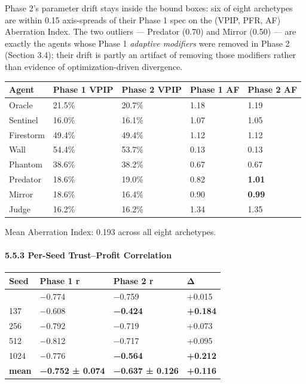 \documentclass[
]{article}
\begin{document}
Phase 2's parameter drift stays inside the bound boxes: six of eight
archetypes are within 0.15 axis-spreads of their Phase 1 spec on the
(VPIP, PFR, AF) Aberration Index. The two outliers --- Predator (0.70)
and Mirror (0.50) --- are exactly the agents whose Phase 1
\emph{adaptive modifiers} were removed in Phase 2 (Section 3.4); their
drift is partly an artifact of removing those modifiers rather than
evidence of optimization-driven divergence.

\begin{longtable}[]{@{}lllll@{}}
\toprule\noalign{}
Agent & Phase 1 VPIP & Phase 2 VPIP & Phase 1 AF & Phase 2 AF \\
\midrule\noalign{}
\endhead
\bottomrule\noalign{}
\endlastfoot
Oracle & 21.5\% & 20.7\% & 1.18 & 1.19 \\
Sentinel & 16.0\% & 16.1\% & 1.07 & 1.05 \\
Firestorm & 49.4\% & 49.4\% & 1.12 & 1.12 \\
Wall & 54.4\% & 53.7\% & 0.13 & 0.13 \\
Phantom & 38.6\% & 38.2\% & 0.67 & 0.67 \\
Predator & 18.6\% & 19.0\% & 0.82 & \textbf{1.01} \\
Mirror & 18.6\% & 16.4\% & 0.90 & \textbf{0.99} \\
Judge & 16.2\% & 16.2\% & 1.34 & 1.35 \\
\end{longtable}

Mean Aberration Index: 0.193 across all eight archetypes.

\hypertarget{per-seed-trustprofit-correlation}{%
\paragraph{5.5.3 Per-Seed Trust--Profit
Correlation}\label{per-seed-trustprofit-correlation}}

\begin{longtable}[]{@{}llll@{}}
\toprule\noalign{}
Seed & Phase 1 r & Phase 2 r & Δ \\
\midrule\noalign{}
\endhead
\bottomrule\noalign{}
\endlastfoot
42 & −0.774 & −0.759 & +0.015 \\
137 & −0.608 & \textbf{−0.424} & \textbf{+0.184} \\
256 & −0.792 & −0.719 & +0.073 \\
512 & −0.812 & −0.717 & +0.095 \\
1024 & −0.776 & \textbf{−0.564} & \textbf{+0.212} \\
\textbf{mean} & \textbf{−0.752 ± 0.074} & \textbf{−0.637 ± 0.126} &
\textbf{+0.116} \\
\end{longtable}
\end{document}
